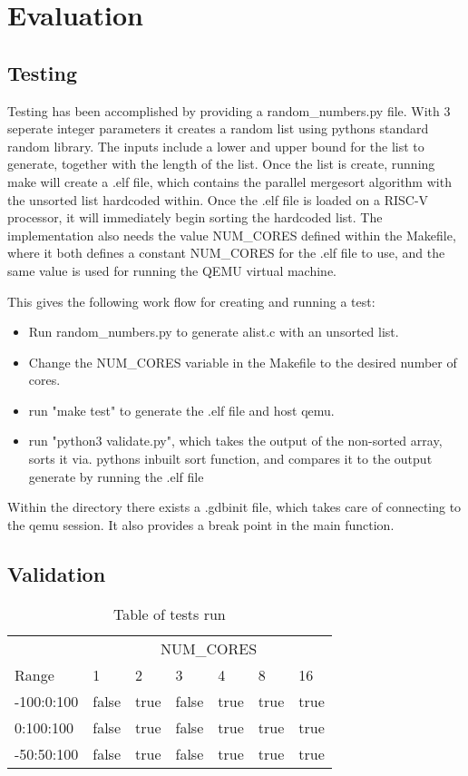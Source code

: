 \section{Evaluation}

\subsection{Testing}
Testing has been accomplished by providing a random\_numbers.py file. With 3
seperate integer parameters it creates a random list using pythons standard
random library. The inputs include a lower and upper bound for the list to
generate, together with the length of the list. Once the list is create, running
make will create a .elf file, which contains the parallel mergesort algorithm
with the unsorted list hardcoded within. Once the .elf file is loaded on a
RISC-V processor, it will immediately begin sorting the hardcoded list. The
implementation also needs the value NUM\_CORES defined within the Makefile,
where it both defines a constant NUM\_CORES for the .elf file to use, and the
same value is used for running the QEMU virtual machine.

This gives the following work flow for creating and running a test:
\begin{itemize}
  \item Run random\_numbers.py to generate alist.c with an unsorted list.
  \item Change the NUM\_CORES variable in the Makefile to the desired number of
    cores.
  \item run "make test" to generate the .elf file and host qemu.
  \item run "python3 validate.py", which takes the output of the non-sorted
    array, sorts it via. pythons inbuilt sort function, and compares it to the
    output generate by running the .elf file
\end{itemize}

Within the directory there exists a .gdbinit file, which takes care of
connecting to the qemu session. It also provides a break point in the main
function.

\subsection{Validation}
\begin{table}
  \caption{Table of tests run}\label{tab:tests}
  \begin{center}
    \begin{tabular}[c]{l|l|l|l|l|l|l}
      & \multicolumn{6}{c}{NUM\_CORES}\\
      \cline{2-7}
       Range & 1 & 2 & 3 & 4 & 8 & 16 \\
      \hline
      -100:0:100 & false & true & false & true & true & true \\
      \hline
      0:100:100 & false & true & false & true & true & true \\
      \hline
      -50:50:100 & false & true & false & true & true & true
    \end{tabular}
  \end{center}
\end{table}

